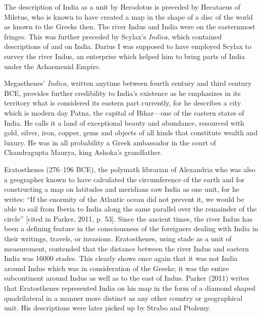 The description of India as a unit by Herodotus is preceded by Hecataeus of Miletus, who is known to have created a map in the shape of a disc of the world as known to the Greeks then. The river Indus and India were on the easternmost fringes. This was further preceded by Scylax’s \textit{Indica}, which contained descriptions of and on India. Darius I was supposed to have employed Scylax to survey the river Indus, an enterprise which helped him to bring parts of India under the Achaemenid Empire.

Megasthenes’ \textit{Indica}, written anytime between fourth century and third century BCE, provides further credibility to India’s existence as he emphasizes in its territory what is considered its eastern part currently, for he describes a city which is modern day Patna, the capital of Bihar—one of the eastern states of India. He calls it a land of exceptional beauty and abundance, resourced with gold, silver, iron, copper, gems and objects of all kinds that constitute wealth and luxury. He was in all probability a Greek ambassador in the court of Chandragupta Maurya, king Ashoka’s grandfather. 

Eratosthenes (276--196 BCE), the polymath librarian of Alexandria who was also a geographer known to have calculated the circumference of the earth and for constructing a map on latitudes and meridians saw India as one unit, for he writes: “If the enormity of the Atlantic ocean did not prevent it, we would be able to sail from Iberia to India along the same parallel over the remainder of the circle” [cited in Parker, 2011, p. 53]. Since the ancient times, the river Indus has been a defining feature in the consciousness of the foreigners dealing with India in their writings, travels, or invasions. Eratosthenes, using stade as a unit of measurement, contended that the distance between the river Indus and eastern India was 16000 stades. This clearly shows once again that it was not India around Indus which was in consideration of the Greeks; it was the entire subcontinent around Indus as well as to the east of Indus. Parker (2011) writes that Eratosthenes represented India on his map in the form of a diamond shaped quadrilateral in a manner more distinct as any other country or geographical unit. His descriptions were later picked up by Strabo and Ptolemy. 

